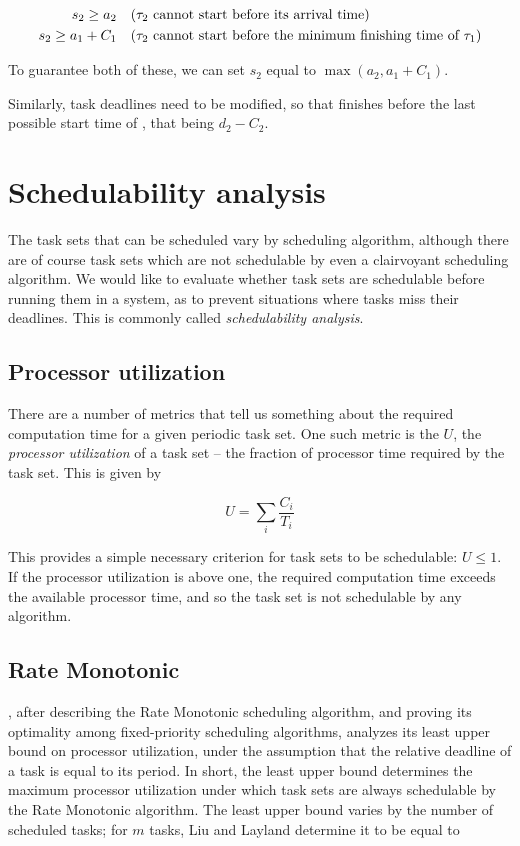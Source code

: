 \begin{align}
    s_2 \ge a_2 \quad &\text{(\ensuremath{\tau_2} cannot start before its arrival time)}\\
    s_2 \ge a_1 + C_1 \quad &\text{(\ensuremath{\tau_2} cannot start before the minimum finishing time of \ensuremath{\tau_1})}
\end{align}

To guarantee both of these, we can set $s_2$ equal to $\max(a_2, a_1 + C_1)$.

Similarly, task deadlines need to be modified, so that  finishes before the last possible start time of , that being $d_2 - C_2$.

\section{Schedulability analysis}
The task sets that can be scheduled vary by scheduling algorithm, although there are of course task sets which are not schedulable by even a clairvoyant scheduling algorithm. We would like to evaluate whether task sets are schedulable before running them in a system, as to prevent situations where tasks miss their deadlines. This is commonly called \emph{schedulability analysis}.

\subsection{Processor utilization}
There are a number of metrics that tell us something about the required computation time for a given periodic task set. One such metric is the $U$, the \emph{processor utilization} of a task set -- the fraction of processor time required by the task set. This is given by

\begin{equation}
U = \sum_i \dfrac{C_i}{T_i}
\end{equation}

This provides a simple necessary criterion for task sets to be schedulable: $U \le 1$. If the processor utilization is above one, the required computation time exceeds the available processor time, and so the task set is not schedulable by any algorithm.

\subsection{Rate Monotonic}
\textcite{Liu1973}, after describing the Rate Monotonic scheduling algorithm, and proving its optimality among fixed-priority scheduling algorithms, analyzes its least upper bound on processor utilization, under the assumption that the relative deadline of a task is equal to its period. In short, the least upper bound determines the maximum processor utilization under which task sets are always schedulable by the Rate Monotonic algorithm. The least upper bound varies by the number of scheduled tasks; for $m$ tasks, Liu and Layland determine it to be equal to


